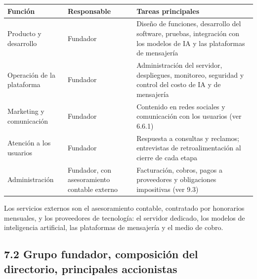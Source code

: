 {\def\LTcaptype{none} %
\begin{longtable}[]{@{}
  >{\raggedright\arraybackslash}p{}
  >{\raggedright\arraybackslash}p{}
  >{\raggedright\arraybackslash}p{}@{}}
\toprule\noalign{}
\begin{minipage}[b]{\linewidth}\raggedright
Función
\end{minipage} & \begin{minipage}[b]{\linewidth}\raggedright
Responsable
\end{minipage} & \begin{minipage}[b]{\linewidth}\raggedright
Tareas principales
\end{minipage} \\
\midrule\noalign{}
\endhead
\bottomrule\noalign{}
\endlastfoot
Producto y desarrollo & Fundador & Diseño de funciones, desarrollo del
software, pruebas, integración con los modelos de IA y las plataformas
de mensajería \\
Operación de la plataforma & Fundador & Administración del servidor,
despliegues, monitoreo, seguridad y control del costo de IA y de
mensajería \\
Marketing y comunicación & Fundador & Contenido en redes sociales y
comunicación con los usuarios (ver 6.6.1) \\
Atención a los usuarios & Fundador & Respuesta a consultas y reclamos;
entrevistas de retroalimentación al cierre de cada etapa \\
Administración & Fundador, con asesoramiento contable externo &
Facturación, cobros, pagos a proveedores y obligaciones impositivas (ver
9.3) \\
\end{longtable}
}

Los servicios externos son el asesoramiento contable, contratado por
honorarios mensuales, y los proveedores de tecnología: el servidor
dedicado, los modelos de inteligencia artificial, las plataformas de
mensajería y el medio de cobro.

\subsection*{7.2 Grupo fundador, composición del directorio, principales
accionistas}\label{grupo-fundador-composiciuxf3n-del-directorio-principales-accionistas}

